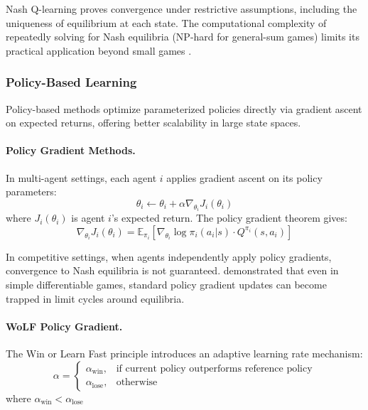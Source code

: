 Nash Q-learning proves convergence under restrictive assumptions, including the uniqueness of equilibrium at each state. The computational complexity of repeatedly solving for Nash equilibria (NP-hard for general-sum games) limits its practical application beyond small games \citep{Daskalakis2009}.

\subsubsection{Policy-Based Learning}

Policy-based methods optimize parameterized policies directly via gradient ascent on expected returns, offering better scalability in large state spaces.

\paragraph{Policy Gradient Methods.} In multi-agent settings, each agent $i$ applies gradient ascent on its policy parameters:
\begin{equation}
\theta_i \leftarrow \theta_i + \alpha \nabla_{\theta_i} J_i(\theta_i)
\end{equation}
where $J_i(\theta_i)$ is agent $i$'s expected return. The policy gradient theorem \citep{Sutton1999} gives:
\begin{equation}
\nabla_{\theta_i} J_i(\theta_i) = \mathbb{E}_{\pi_i} [\nabla_{\theta_i} \log \pi_i(a_i|s) \cdot Q^{\pi_i}(s,a_i)]
\end{equation}

In competitive settings, when agents independently apply policy gradients, convergence to Nash equilibria is not guaranteed. \citet{Mazumdar2019} demonstrated that even in simple differentiable games, standard policy gradient updates can become trapped in limit cycles around equilibria.

\paragraph{WoLF Policy Gradient.} The Win or Learn Fast principle \citep{BowlingVeloso2002} introduces an adaptive learning rate mechanism:
\begin{equation}
\alpha = 
\begin{cases}
\alpha_{\text{win}}, & \text{if current policy outperforms reference policy} \\
\alpha_{\text{lose}}, & \text{otherwise}
\end{cases}
\end{equation}
where $\alpha_{\text{win}} < \alpha_{\text{lose}}$

